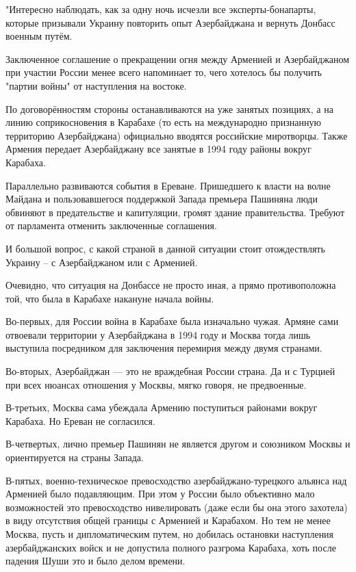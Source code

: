 "Интересно наблюдать, как за одну ночь исчезли все эксперты-бонапарты, которые
призывали Украину повторить опыт Азербайджана и вернуть Донбасс военным путём.

Заключенное соглашение о прекращении огня между Арменией и Азербайджаном при
участии России менее всего напоминает то, чего хотелось бы получить "партии
войны" от наступления на востоке.

По договорённостям стороны останавливаются на уже занятых позициях, а на линию
соприкосновения в Карабахе (то есть на международно признанную территорию
Азербайджана) официально вводятся российские миротворцы. Также Армения передает
Азербайджану все занятые в 1994 году районы вокруг Карабаха.

Параллельно развиваются события в Ереване. Пришедшего к власти на волне Майдана
и пользовавшегося поддержкой Запада премьера Пашиняна люди обвиняют в
предательстве и капитуляции, громят здание правительства. Требуют от парламента
отменить заключенные соглашения.

И большой вопрос, с какой страной в данной ситуации стоит отождествлять Украину
– с Азербайджаном или с Арменией.

Очевидно, что ситуация на Донбассе не просто иная, а прямо противоположна той,
что была в Карабахе накануне начала войны.

Во-первых, для России война в Карабахе была изначально чужая. Армяне сами
отвоевали территории у Азербайджана в 1994 году и Москва тогда лишь выступила
посредником для заключения перемирия между двумя странами.

Во-вторых, Азербайджан --- это не враждебная России страна. Да и с Турцией при
всех нюансах отношения у Москвы, мягко говоря, не предвоенные.

В-третьих, Москва сама убеждала Армению поступиться районами вокруг Карабаха.
Но Ереван не согласился.

В-четвертых, лично премьер Пашинян не является другом и союзником Москвы и
ориентируется на страны Запада.

В-пятых, военно-техническое превосходство азербайджано-турецкого альянса над
Арменией было подавляющим. При этом у России было объективно мало возможностей
это превосходство нивелировать (даже если бы она этого захотела) в виду
отсутствия общей границы с Арменией и Карабахом. Но тем не менее Москва, пусть
и дипломатическим путем, но добилась остановки наступления азербайджанских
войск и не допустила полного разгрома Карабаха, хоть после падения Шуши это и
было делом времени.

